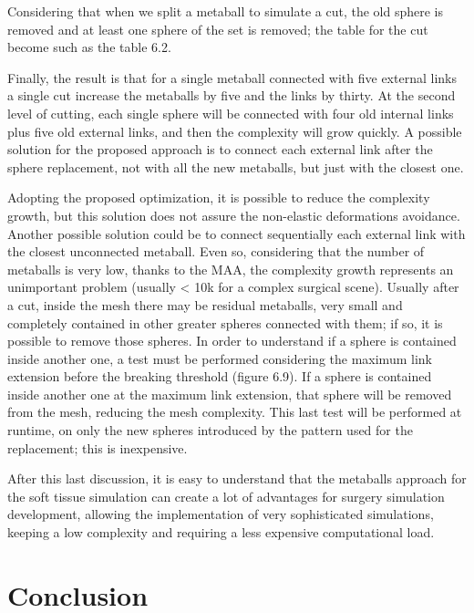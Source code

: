\documentclass[journal]{vgtc}                %
\begin{document}
Considering that when we split a metaball to simulate a cut, the old sphere is
removed and at least one sphere of the set is removed; the table for the cut become
such as the table 6.2.

Finally, the result is that for a single metaball connected with five external links a
single cut increase the metaballs by five and the links by thirty. At the second level
of cutting, each single sphere will be connected with four old internal links plus five
old external links, and then the complexity will grow quickly. A possible solution for
the proposed approach is to connect each external link after the sphere replacement,
not with all the new metaballs, but just with the closest one.

Adopting the proposed optimization, it is possible to reduce the complexity growth,
but this solution does not assure the non-elastic deformations avoidance. Another
possible solution could be to connect sequentially each external link with the closest
unconnected metaball. Even so, considering that the number of metaballs is very low,
thanks to the MAA, the complexity growth represents an unimportant problem
(usually < 10k for a complex surgical scene).
Usually after a cut, inside the mesh there may be residual metaballs, very small and
completely contained in other greater spheres connected with them; if so, it is
possible to remove those spheres. In order to understand if a sphere is contained
inside another one, a test must be performed considering the maximum link
extension before the breaking threshold (figure 6.9). If a sphere is contained inside
another one at the maximum link extension, that sphere will be removed from the
mesh, reducing the mesh complexity. This last test will be performed at runtime, on
only the new spheres introduced by the pattern used for the replacement; this is
inexpensive.

After this last discussion, it is easy to understand that the metaballs approach for the
soft tissue simulation can create a lot of advantages for surgery simulation
development, allowing the implementation of very sophisticated simulations,
keeping a low complexity and requiring a less expensive computational load.


\section{Conclusion}





\end{document}
